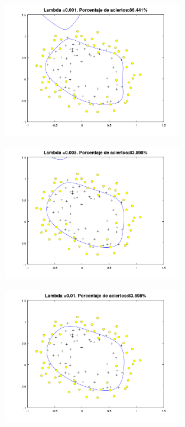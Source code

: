\documentclass{article}
\begin{document}
\begin{figure}[h]
\centering
\includegraphics[width=0.7\textwidth]{estudio1}
\label{fig:estudio}
\end{figure}

\begin{figure}[h]
\centering
\includegraphics[width=0.7\textwidth]{estudio2}
\label{fig:estudio}
\end{figure}

\begin{figure}[h]
\centering
\includegraphics[width=0.7\textwidth]{estudio3}
\label{fig:estudio}
\end{figure}
\end{document}
